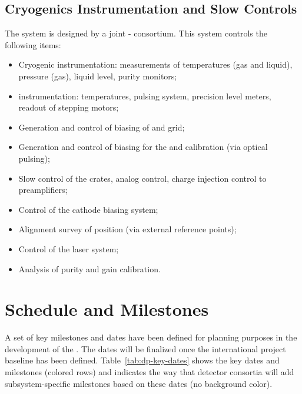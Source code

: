 \subsection{Cryogenics Instrumentation and Slow Controls}
\label{sec:dp-execsum-sc}
The  system is designed by a joint - consortium. 
This system controls the following items:

\begin{itemize}
\item Cryogenic instrumentation: measurements of temperatures (gas and liquid), pressure (gas), liquid level, purity monitors;
\item {} instrumentation: temperatures, pulsing system, precision level meters, readout of  stepping motors;
\item Generation and control of  biasing of  and grid;
\item Generation and control of  biasing for the  and calibration (via optical pulsing);
\item Slow control of the  crates, analog  control, charge injection control to preamplifiers;
\item Control of the cathode  biasing system;
\item Alignment survey of  position (via external reference points);
\item Control of the laser system;
\item Analysis of  purity and   gain calibration.
\end{itemize}


\section{Schedule and Milestones}
\label{sec:fddp-exec-sched}

A set of key milestones and dates  have been defined for planning purposes in the development of the .  The dates will be finalized once the international project baseline has been defined.  Table~\ref{tab:dp-key-dates} shows the key dates and milestones (colored rows) and indicates the way that detector consortia will add subsystem-specific milestones based on these dates (no background color).
 

